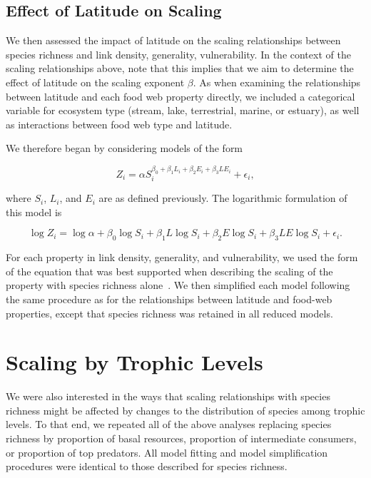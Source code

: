 \documentclass[12pt]{article}
\begin{document}
\subsection*{Effect of Latitude on Scaling}



  We then assessed the impact of latitude on the scaling relationships between species richness and 
  link density, generality, vulnerability. In the context of the scaling relationships above, note 
  that this implies that we aim to determine the effect of latitude on
  the scaling exponent $\beta$. As when examining the relationships between latitude and each food 
  web property directly, we included a categorical variable for ecosystem type (stream, lake, 
  terrestrial, marine, or estuary), as well as interactions between food web type and latitude.


  We therefore began by considering models of the form

  \begin{equation}
  \label{PowerLat}
  Z_{i}=\alpha S_{i}^{\beta_{0}+\beta_{1}L_{i}+\beta_{2}E_{i}+\beta_{3}LE_{i}} + \epsilon_{i} ,
  \end{equation}

  \noindent where $S_{i}$, $L_{i}$, and $E_{i}$ are as defined previously. The logarithmic formulation of this model is

  \begin{equation}
  \label{LogLat}
  \log{Z_{i}} = \log{\alpha}+\beta_{0}\log{S_{i}} + \beta_{1}L\log{S_{i}} +\beta_{2}E\log{S_{i}} +\beta_{3}LE\log{S_{i}} +\epsilon_{i} .
  \end{equation}

  For each property in link density, generality, and vulnerability, we used the form of the equation that was best supported
  when describing the scaling of the property with species richness alone~\citep{Xiao2011}.
  We then simplified each model following the same procedure as for the relationships between
  latitude and food-web properties, except that species richness was retained in all reduced models. 


\section*{Scaling by Trophic Levels}

  We were also interested in the ways that scaling relationships with species richness might
  be affected by changes to the distribution of species among trophic levels. To
  that end, we repeated all of the above analyses replacing species richness by
  proportion of basal resources, proportion of intermediate consumers,
  or proportion of top predators. All model fitting and model
  simplification procedures were identical to those described for species
  richness.
\end{document}
